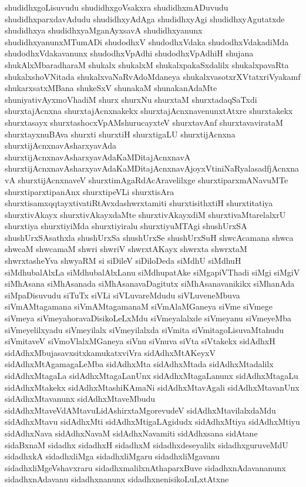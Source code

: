 {shudidhxgoLisuvudu
shudidhxgoVsakxra
shudidhxmADuvudu
shudidhxparxdavAdudu
shudidhxyAdAga
shudidhxyAgi
shudidhxyAgutatxde
shudidhxya
shudidhxyaMganAyxsavA
shudidhxyanunx
shudidhxyanunxMTumADi
shudodhxV
shudodhxVdaka
shudodhxVdakadiMda
shudodhxVdakavanunx
shudodhxVpAdhi
shudodhxVpAdhiH
shujana
shukAlxMbaradharaM
shukalx
shukalxM
shukalxpakaSxdalilx
shukalxpavaRta
shukalxshoVNitada
shukalxvaNaRvAdoMdaneya
shukalxvasotxrXVtatxriVyakamf
shukarxsatxMBana
shukeSxV
shunakaM
shunakanAdaMte
shuniyativAyxmoVhadiM
shurx
shurxNu
shurxtaM
shurxtadaqSaTxdi
shurxtajAcnxna
shurxtajAcnxnakekx
shurxtajAcnxnavenunxtAtxre
shurxtakekx
shurxtasayx
shurxtashocxVpAMshurucayxteV
shurxtavAnf
shurxtavavirataM
shurxtayxnuBAva
shurxti
shurxtiH
shurxtigaLU
shurxtijAcnxna
shurxtijAcnxnavAsharxyavAda
shurxtijAcnxnavAsharxyavAdaKaMDitajAcnxnavA
shurxtijAcnxnavAsharxyavAdaKaMDitajAcnxnavAjoyxVtiniNaRyalasadfjAcnxnavA
shurxtijAcnxnaveV
shurxtimAgaRdAcAravelilxge
shurxtiparxmANavuMTe
shurxtiparxtipanAnx
shurxtipeVLi
shurxtisAra
shurxtisamxqqtayxtivatiRtAvxdashwrxtamiti
shurxtisithxtiH
shurxtitatiya
shurxtivAkayx
shurxtivAkayxdaMte
shurxtivAkayxdiM
shurxtivaMtarelalxrU
shurxtiya
shurxtiyiMda
shurxtiyiralu
shurxtiyuMTAgi
shushUrxSA
shushUrxSAsathxla
shushUrxSa
shushUrxSe
shushUrxSuH
shwcAcamana
shwca
shwcaM
shwcamaM
shwri
shwriV
shwrxtAKayx
shwrxta
shwrxtaM
shwrxtasheYva
shwyaRM
si
siDileV
siDiloDeda
siMdhU
siMdhuH
siMdhubalAlxLa
siMdhubalAlxLanu
siMdhupatAke
siMgapiVThadi
siMgi
siMgiV
siMhAsana
siMhAsanada
siMhAsanavaDagitutx
siMhAsanavanikikx
siMhanAda
siMpaDisuvudu
siTuTx
siVLi
siVLuvareMdudu
siVLuveneMbuva
siVmAMtagamana
siVmAMtagamanaM
siVmAlaMGaneya
siVme
siVmege
siVmeya
siVmeyahoravaDisikoLeLxMdu
siVmeyalalxde
siVmeyanu
siVmeyeMba
siVmeyelilxyadu
siVmeyilalx
siVmeyilalxda
siVmita
siVmitagoLisuvaMtahudu
siVmitaveV
siVmoVlalxMGaneya
siVnu
siVnuva
siVta
siVtakekx
sidAdhxH
sidAdhxMbujasavxsitxkamukatxviVra
sidAdhxMtAKeyxV
sidAdhxMtAgamagaLeMba
sidAdhxMta
sidAdhxMtada
sidAdhxMtadalilx
sidAdhxMtagaLa
sidAdhxMtagaLanUnx
sidAdhxMtagaLanunx
sidAdhxMtagaLu
sidAdhxMtakekx
sidAdhxMtashiKAmaNi
sidAdhxMtavAgali
sidAdhxMtavanUnx
sidAdhxMtavanunx
sidAdhxMtaveMbudu
sidAdhxMtaveVdAMtavuLidAshirxtaMgorevudeV
sidAdhxMtavilalxdaMdu
sidAdhxMtavu
sidAdhxMti
sidAdhxMtigaLAgidudx
sidAdhxMtiya
sidAdhxMtiyu
sidAdhxNava
sidAdhxNavaM
sidAdhxNavamiti
sidAdhxsana
sidAtane
sidaBxnaM
sidadhx
sidadhxH
sidadhxM
sidadhxdeseyalilx
sidadhxguruveMdU
sidadhxkA
sidadhxliMga
sidadhxliMgaru
sidadhxliMgavanu
sidadhxliMgeVshavxraru
sidadhxmalilxnAthaparxBuve
sidadhxnAdavananunx
sidadhxnAdavanu
sidadhxnanunx
sidadhxnenisikoLuLxtAtxne
}
